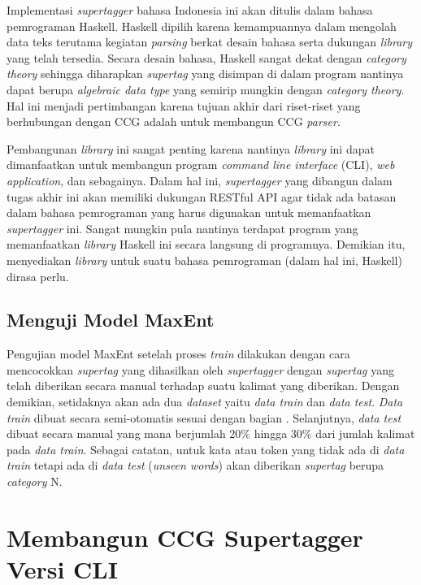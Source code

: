 Implementasi \textit{supertagger} bahasa Indonesia ini akan ditulis dalam bahasa pemrograman Haskell.
Haskell dipilih karena kemampuannya dalam mengolah data teks terutama kegiatan \textit{parsing} berkat
desain bahasa serta dukungan \textit{library} yang telah tersedia.
Secara desain bahasa, Haskell sangat dekat dengan \textit{category theory} sehingga diharapkan
\textit{supertag} yang disimpan di dalam program nantinya dapat berupa \textit{algebraic data type}
yang semirip mungkin dengan \textit{category theory}.
Hal ini menjadi pertimbangan karena tujuan akhir dari riset-riset yang berhubungan dengan CCG adalah
untuk membangun CCG \textit{parser}.

Pembangunan \textit{library} ini sangat penting karena nantinya \textit{library} ini dapat dimanfaatkan
untuk membangun program \textit{command line interface} (CLI), \textit{web application}, dan sebagainya.
Dalam hal ini, \textit{supertagger} yang dibangun dalam tugas akhir ini akan memiliki dukungan RESTful
API agar tidak ada batasan dalam bahasa pemrograman yang harus digunakan untuk memanfaatkan
\textit{supertagger} ini.
Sangat mungkin pula nantinya terdapat program yang memanfaatkan \textit{library} Haskell ini secara
langsung di programnya.
Demikian itu, menyediakan \textit{library} untuk suatu bahasa pemrograman (dalam hal ini, Haskell)
dirasa perlu.

\subsection{Menguji Model MaxEnt}

Pengujian model MaxEnt setelah proses \textit{train} dilakukan dengan cara mencocokkan \textit{supertag}
yang dihasilkan oleh \textit{supertagger} dengan \textit{supertag} yang telah diberikan secara manual
terhadap suatu kalimat yang diberikan.
Dengan demikian, setidaknya akan ada dua \textit{dataset} yaitu \textit{data train} dan
\textit{data test}.
\textit{Data train} dibuat secara semi-otomatis sesuai dengan bagian .
Selanjutnya, \textit{data test} dibuat secara manual yang mana berjumlah $20\%$ hingga $30\%$ dari
jumlah kalimat pada \textit{data train}.
Sebagai catatan, untuk kata atau token yang tidak ada di \textit{data train} tetapi ada di
\textit{data test} (\textit{unseen words}) akan diberikan \textit{supertag} berupa
\textit{category} $\text{N}$.

\section{Membangun CCG Supertagger Versi CLI}

